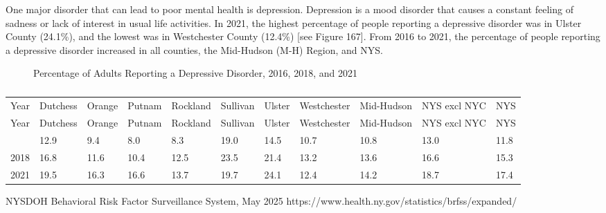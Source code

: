 \documentclass[
  english,
  letterpaper,
]{report}
\begin{document}
One major disorder that can lead to poor mental health is depression.
Depression is a mood disorder that causes a constant feeling of sadness
or lack of interest in usual life activities. In 2021, the highest
percentage of people reporting a depressive disorder was in Ulster
County (24.1\%), and the lowest was in Westchester County (12.4\%)
{[}see Figure 167{]}. From 2016 to 2021, the percentage of people
reporting a depressive disorder increased in all counties, the
Mid-Hudson (M-H) Region, and NYS.

\begin{figure}


\caption{\label{fig-adult-depressive-do-percent}Percentage of Adults
Reporting a Depressive Disorder, 2016, 2018, and 2021}

\end{figure}%

\begin{longtable}[]{@{}lllllllllll@{}}

\caption{\label{tbl-adult-depressive-do-percent}Percentage of Adults
Reporting a Depressive Disorder, 2016, 2018, and 2021}

\tabularnewline

\caption{}\label{T_a8baf}\tabularnewline
\toprule\noalign{}
Year & Dutchess & Orange & Putnam & Rockland & Sullivan & Ulster &
Westchester & Mid-Hudson & NYS excl NYC & NYS \\
\midrule\noalign{}
\endfirsthead
\toprule\noalign{}
Year & Dutchess & Orange & Putnam & Rockland & Sullivan & Ulster &
Westchester & Mid-Hudson & NYS excl NYC & NYS \\
\midrule\noalign{}
\endhead
\bottomrule\noalign{}
\endlastfoot
2016 & 12.9 & 9.4 & 8.0 & 8.3 & 19.0 & 14.5 & 10.7 & 10.8 & 13.0 &
11.8 \\
2018 & 16.8 & 11.6 & 10.4 & 12.5 & 23.5 & 21.4 & 13.2 & 13.6 & 16.6 &
15.3 \\
2021 & 19.5 & 16.3 & 16.6 & 13.7 & 19.7 & 24.1 & 12.4 & 14.2 & 18.7 &
17.4 \\

\end{longtable}

\begin{tcolorbox}[enhanced jigsaw, breakable, leftrule=.75mm, title=\textcolor{quarto-callout-note-color}{\faInfo}\hspace{0.5em}{Source}, bottomrule=.15mm, opacityback=0, left=2mm, colback=white, bottomtitle=1mm, coltitle=black, colbacktitle=quarto-callout-note-color!10!white, colframe=quarto-callout-note-color-frame, opacitybacktitle=0.6, toptitle=1mm, titlerule=0mm, arc=.35mm, rightrule=.15mm, toprule=.15mm]

NYSDOH Behavioral Risk Factor Surveillance System, May 2025
https://www.health.ny.gov/statistics/brfss/expanded/

\end{tcolorbox}
\end{document}
